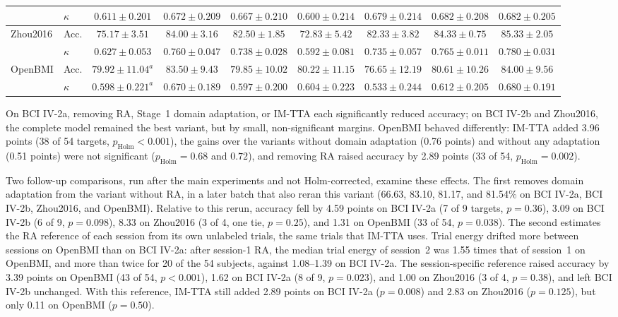 \documentclass[preprint,12pt]{elsarticle}
\begin{document}
\begin{table}[!htbp]
\begin{adjustbox}{max width=\textwidth}
\begin{tabular}{llccccccc}
 & $\kappa$ & $0.611\pm0.201$ & $0.672\pm0.209$ & $0.667\pm0.210$ & $0.600\pm0.214$ & $0.679\pm0.214$ & $\mathbf{0.682\pm0.208}$ & $\mathbf{0.682\pm0.205}$ \\
\midrule
\multirow{2}{*}{Zhou2016}
 & Acc. & $75.17\pm3.51$ & $84.00\pm3.16$ & $82.50\pm1.85$ & $72.83\pm5.42$ & $82.33\pm3.82$ & $84.33\pm0.75$ & $\mathbf{85.33\pm2.05}$ \\
 & $\kappa$ & $0.627\pm0.053$ & $0.760\pm0.047$ & $0.738\pm0.028$ & $0.592\pm0.081$ & $0.735\pm0.057$ & $0.765\pm0.011$ & $\mathbf{0.780\pm0.031}$ \\
\midrule
\multirow{2}{*}{OpenBMI}
 & Acc. & $79.92\pm11.04^{a}$ & $83.50\pm9.43$ & $79.85\pm10.02$ & $80.22\pm11.15$ & $76.65\pm12.19$ & $80.61\pm10.26$ & $\mathbf{84.00\pm9.56}$ \\
 & $\kappa$ & $0.598\pm0.221^{a}$ & $0.670\pm0.189$ & $0.597\pm0.200$ & $0.604\pm0.223$ & $0.533\pm0.244$ & $0.612\pm0.205$ & $\mathbf{0.680\pm0.191}$ \\
\bottomrule
\end{tabular}
\end{adjustbox}
\end{table}

On BCI IV-2a, removing RA, Stage~1 domain adaptation, or IM-TTA each significantly reduced accuracy; on BCI IV-2b and Zhou2016, the complete model remained the best variant, but by small, non-significant margins. OpenBMI behaved differently: IM-TTA added 3.96 points (38 of 54 targets, $p_\mathrm{Holm}<0.001$), the gains over the variants without domain adaptation (0.76 points) and without any adaptation (0.51 points) were not significant ($p_\mathrm{Holm}=0.68$ and $0.72$), and removing RA raised accuracy by 2.89 points (33 of 54, $p_\mathrm{Holm}=0.002$).

Two follow-up comparisons, run after the main experiments and not Holm-corrected, examine these effects. The first removes domain adaptation from the variant without RA, in a later batch that also reran this variant (66.63, 83.10, 81.17, and 81.54\% on BCI IV-2a, BCI IV-2b, Zhou2016, and OpenBMI). Relative to this rerun, accuracy fell by 4.59 points on BCI IV-2a (7 of 9 targets, $p=0.36$), 3.09 on BCI IV-2b (6 of 9, $p=0.098$), 8.33 on Zhou2016 (3 of 4, one tie, $p=0.25$), and 1.31 on OpenBMI (33 of 54, $p=0.038$). The second estimates the RA reference of each session from its own unlabeled trials, the same trials that IM-TTA uses. Trial energy drifted more between sessions on OpenBMI than on BCI IV-2a: after session-1 RA, the median trial energy of session~2 was 1.55 times that of session~1 on OpenBMI, and more than twice for 20 of the 54 subjects, against 1.08--1.39 on BCI IV-2a. The session-specific reference raised accuracy by 3.39 points on OpenBMI (43 of 54, $p<0.001$), 1.62 on BCI IV-2a (8 of 9, $p=0.023$), and 1.00 on Zhou2016 (3 of 4, $p=0.38$), and left BCI IV-2b unchanged. With this reference, IM-TTA still added 2.89 points on BCI IV-2a ($p=0.008$) and 2.83 on Zhou2016 ($p=0.125$), but only 0.11 on OpenBMI ($p=0.50$).
\end{document}
